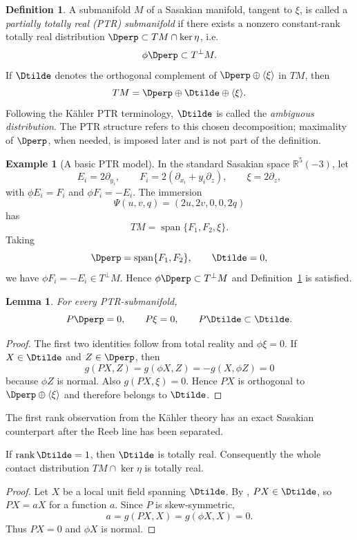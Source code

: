 \documentclass[11pt]{article}
\newtheorem{lemma}[theorem]{Lemma}\newtheorem{corollary}[theorem]{Corollary}
\theoremstyle{definition}\newtheorem{definition}[theorem]{Definition}\newtheorem{example}[theorem]{Example}
\theoremstyle{remark}\newtheorem{remark}[theorem]{Remark}
\newcommand{\Tperp}{T^{\perp}M}
\begin{document}
\begin{definition}\label{def:ptr}
A submanifold $M$ of a Sasakian manifold, tangent to $\xi$, is called a \emph{partially totally real (PTR) submanifold} if there exists a nonzero constant-rank totally real distribution $\Dperp\subset TM\cap\ker\eta$, i.e.
\[
 \phi\Dperp\subset\Tperp.
\]
If $\Dtilde$ denotes the orthogonal complement of $\Dperp\oplus\langle\xi\rangle$ in $TM$, then
\begin{equation}\label{eq:ptrsplit}
 TM=\Dperp\oplus\Dtilde\oplus\langle\xi\rangle.
\end{equation}
Following the K\"ahler PTR terminology, $\Dtilde$ is called the
\emph{ambiguous distribution}.  The PTR structure refers to this chosen
decomposition; maximality of \(\Dperp\), when needed, is imposed later
and is not part of the definition.
\end{definition}

\begin{example}[A basic PTR model]\label{ex:def-ptr-immediate}
In the standard Sasakian space \(\mathbb R^5(-3)\), let
\[
E_i=2\partial_{y_i},\qquad
F_i=2(\partial_{x_i}+y_i\partial_z),\qquad
\xi=2\partial_z,
\]
with \(\phi E_i=F_i\) and \(\phi F_i=-E_i\).  The immersion
\[
\Psi(u,v,q)=(2u,2v,0,0,2q)
\]
has
\[
TM=\operatorname{span}\{F_1,F_2,\xi\}.
\]
Taking
\[
\Dperp=\operatorname{span}\{F_1,F_2\},\qquad \Dtilde=0,
\]
we have \(\phi F_i=-E_i\in T^\perp M\).  Hence
\(\phi\Dperp\subset T^\perp M\) and Definition~\ref{def:ptr} is satisfied.
\end{example}


\begin{lemma}\label{lem:Pinvariant}
For every PTR-submanifold,
\[
 P\Dperp=0,\qquad P\xi=0,\qquad P\Dtilde\subset\Dtilde.
\]
\end{lemma}
\begin{proof}
The first two identities follow from total reality and $\phi\xi=0$. If $X\in\Dtilde$ and $Z\in\Dperp$, then
\[
 g(PX,Z)=g(\phi X,Z)=-g(X,\phi Z)=0
\]
because $\phi Z$ is normal. Also $g(PX,\xi)=0$. Hence $PX$ is orthogonal to $\Dperp\oplus\langle\xi\rangle$ and therefore belongs to $\Dtilde$.
\end{proof}

The first rank observation from the K\"ahler theory has an exact Sasakian counterpart after the Reeb line has been separated.
\begin{proposition}\label{prop:rankone}
If $\operatorname{rank}\Dtilde=1$, then $\Dtilde$ is totally real. Consequently the whole contact distribution $TM\cap\ker\eta$ is totally real.
\end{proposition}
\begin{proof}
Let $X$ be a local unit field spanning $\Dtilde$. By , $PX\in\Dtilde$, so $PX=aX$ for a function $a$. Since $P$ is skew-symmetric,
\[
 a=g(PX,X)=g(\phi X,X)=0.
\]
Thus $PX=0$ and $\phi X$ is normal.
\end{proof}
\end{document}
